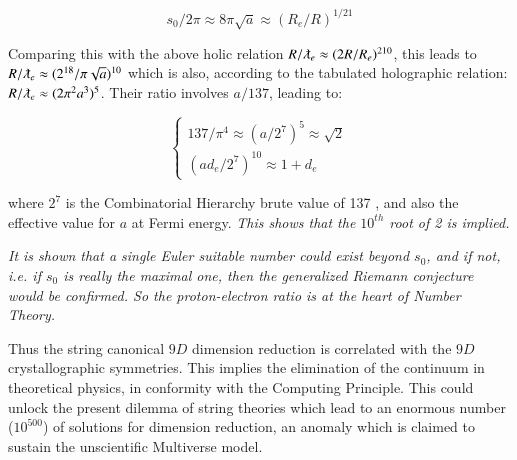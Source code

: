 \documentclass[a4paper,9pt]{article}
\newcounter{row}
\begin{document}
\begin{equation}\label{Eq19}
s_0/2\pi \approx 8\pi \sqrt a \approx (R_e/R)^{1/21}
 \end{equation}

Comparing this with the above holic relation $R/ \lambdabar_e \approx (2R/R_e)^{210}$, this leads to $R/\lambdabar_e \approx (2^{18}/\pi \sqrt a)^{10}$ which is also, according to the tabulated holographic relation: $R/\lambdabar_e \approx (2 \pi^2 a^3)^{5}$. Their ratio involves $a/137$, leading to: 

\begin{equation}\label{Eq21}
 \left\{
    \begin{array}{ll}
        137 / \pi^4 \approx (a/2^7)^5  \approx \sqrt 2 \\
       (ad_e/2^7)^{10} \approx 1 + d_e
    \end{array}
\right.
\end{equation}

where $2^7$ is the Combinatorial Hierarchy brute value of 137 \cite {Bastin}, and also the effective value for $a$ at Fermi energy. \textit{This shows that the $10^{th}$ root of 2 is implied.}

\textit{It is shown \cite{Weinberger} that a single Euler suitable number could exist beyond $s_0$, and if not, i.e. if $s_0$ is really the maximal one, then the generalized Riemann conjecture would be confirmed. So the proton-electron ratio is at the heart of Number Theory.}

Thus the string canonical $9D$ dimension reduction is correlated with the $9D$ crystallographic symmetries. This implies the elimination of the continuum in theoretical physics, in conformity with the Computing Principle. This could unlock the present dilemma of string theories which lead to an enormous number ($10^{500}$) of solutions for dimension reduction, an anomaly which is claimed to sustain the unscientific Multiverse model.



 
 
\end{document}
